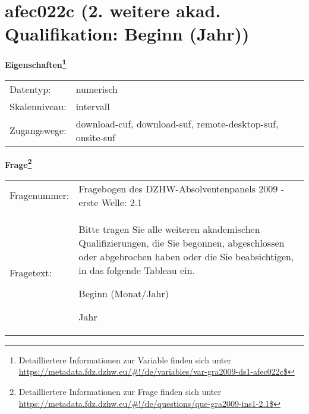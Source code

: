 
    \setcounter{footnote}{0}

    \vspace*{-1.8cm}
	\section{afec022c (2. weitere akad. Qualifikation: Beginn (Jahr))}
	\label{section:afec022c}



    \vspace*{0.5cm}
    \noindent\textbf{Eigenschaften\footnote{Detailliertere Informationen zur Variable finden sich unter
		\url{https://metadata.fdz.dzhw.eu/\#!/de/variables/var-gra2009-ds1-afec022c$}}}\\
	\begin{tabularx}{\hsize}{@{}lX}
	Datentyp: & numerisch \\
	Skalenniveau: & intervall \\
	Zugangswege: &
	  download-cuf, 
	  download-suf, 
	  remote-desktop-suf, 
	  onsite-suf
 \\
    \end{tabularx}



				\vspace*{0.5cm}
                \noindent\textbf{Frage\footnote{Detailliertere Informationen zur Frage finden sich unter
		              \url{https://metadata.fdz.dzhw.eu/\#!/de/questions/que-gra2009-ins1-2.1$}}}\\
				\begin{tabularx}{\hsize}{@{}lX}
					Fragenummer: &
					  Fragebogen des DZHW-Absolventenpanels 2009 - erste Welle:
					  2.1
 \\
					Fragetext: & Bitte tragen Sie alle weiteren akademischen Qualifizierungen, die Sie begonnen, abgeschlossen oder abgebrochen haben oder die Sie beabsichtigen, in das folgende Tableau ein.\par  Beginn (Monat/Jahr)\par  Jahr \\
				\end{tabularx}





